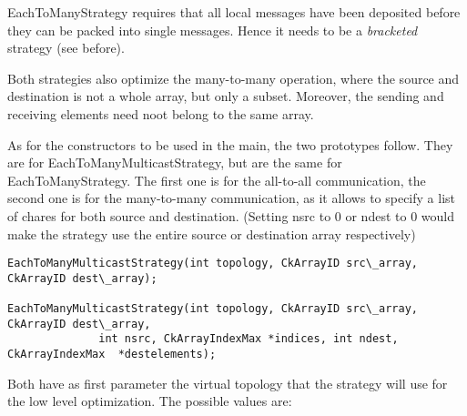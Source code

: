 {EachToManyStrategy requires that all local messages have been deposited before
they can be packed into single messages. Hence it needs to be a {\em bracketed}
strategy (see before).




Both strategies also optimize the many-to-many operation, where the source and
destination is not a whole array, but only a subset. Moreover, the sending and
receiving elements need noot belong to the same array.

As for the constructors to be used in the main, the two prototypes follow. They
are for EachToManyMulticastStrategy, but are the same for EachToManyStrategy.
The first one is for the all-to-all communication, the second one is for the
many-to-many communication, as it allows to specify a list of chares for both
source and destination. (Setting nsrc to 0 or ndest to 0 would make the strategy
use the entire source or destination array respectively)


\begin{verbatim}
EachToManyMulticastStrategy(int topology, CkArrayID src\_array, CkArrayID dest\_array);

EachToManyMulticastStrategy(int topology, CkArrayID src\_array, CkArrayID dest\_array,
              int nsrc, CkArrayIndexMax *indices, int ndest, CkArrayIndexMax  *destelements);
\end{verbatim}

Both have as first parameter the virtual topology that the strategy will use for
the low level optimization. The possible values are:

}
